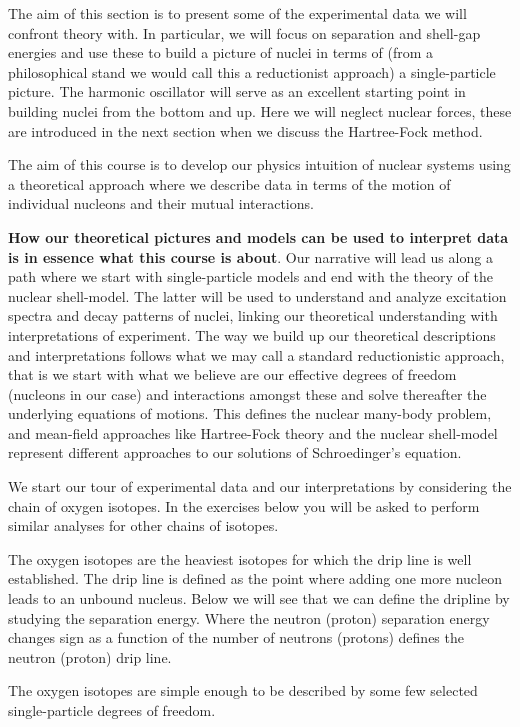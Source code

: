 \documentclass[%
twoside,                 %
final,                   %
10pt]{article}
\begin{document}
The aim of this section is to present some of the experimental data we will confront theory with. In particular, we will focus on separation and shell-gap energies and use these to build a picture of nuclei in terms of (from a philosophical stand we would call this  a reductionist approach) a single-particle picture. The harmonic oscillator will serve as an excellent starting point in building nuclei from the bottom and up. Here we will neglect nuclear forces, these are introduced in the next section when we discuss the Hartree-Fock method. 

The aim of this course is to develop our physics intuition of nuclear systems using  a theoretical approach  where we describe data in terms of 
the motion of individual nucleons and their mutual interactions. 

\textbf{How our theoretical pictures and models can be used to interpret data is in essence what this course is about}. Our narrative will lead us along a path where we start with single-particle models and end with the theory of the nuclear shell-model. The latter will be used to understand and analyze excitation spectra and decay patterns of nuclei, linking our theoretical understanding with interpretations of experiment. The way we build up our theoretical descriptions and interpretations follows what we may call a standard reductionistic approach, that is we start with what we believe are our effective degrees of freedom (nucleons in our case) and interactions amongst these and solve thereafter the underlying equations of motions. This defines the nuclear many-body problem, and mean-field approaches like Hartree-Fock theory and the nuclear shell-model represent different approaches to our solutions of Schroedinger's equation. 



We start our tour of experimental data and our interpretations by considering the chain of oxygen isotopes. In the exercises below you will be asked to perform similar analyses for other chains of isotopes.

The oxygen isotopes are the heaviest isotopes for which the drip line is well established.  The drip line is defined as the point where adding one more nucleon leads to an unbound nucleus. Below we will see that we can define the dripline by studying the separation energy. Where the neutron (proton) separation energy changes sign as a function of the number of neutrons (protons) defines the neutron (proton) drip line.

The oxygen isotopes are simple enough to be described by some few selected single-particle degrees of freedom.  
\end{document}
